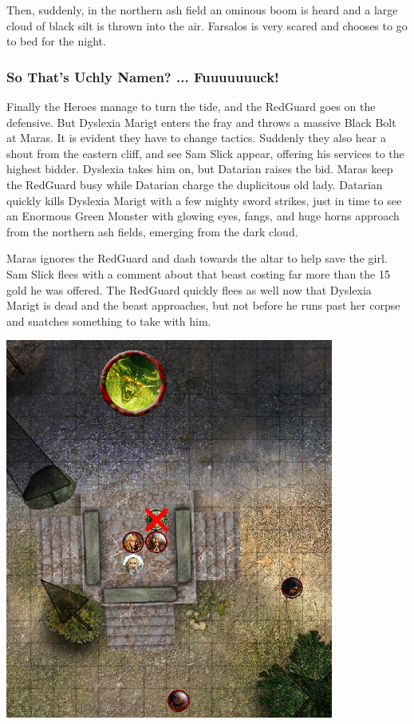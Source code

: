 Then, suddenly, in the northern ash field an ominous boom is heard and a large cloud of black silt is thrown into the air. Farsalos is very scared and chooses to go to bed for the night.

\subsubsection*{So That's Uchly Namen? ... Fuuuuuuuck!}
Finally the Heroes manage to turn the tide, and the RedGuard goes on the defensive. But Dyslexia Marigt enters the fray and throws a massive Black Bolt at Maras. It is evident they have to change tactics. Suddenly they also hear a shout from the eastern cliff, and see Sam Slick appear, offering his services to the highest bidder. Dyslexia takes him on, but Datarian raises the bid.
Maras keep the RedGuard busy while Datarian charge the duplicitous old lady. Datarian quickly kills Dyslexia Marigt with a few mighty sword strikes, just in time to see an Enormous Green Monster with glowing eyes, fangs, and huge horns approach from the northern ash fields, emerging from the dark cloud.

Maras ignores the RedGuard and dash towards the altar to help save the girl. Sam Slick flees with a comment about that beast costing far more than the 15 gold he was offered. The RedGuard quickly flees as well now that Dyslexia Marigt is dead and the beast approaches, but not before he runs past her corpse and snatches something to take with him.

\begin{center}
\vspace{0.5 cm}
\includegraphics[width=0.7\linewidth]{./figs/playthrough/summoning-demon.png}
\vspace{0.5 cm}
\end{center}

